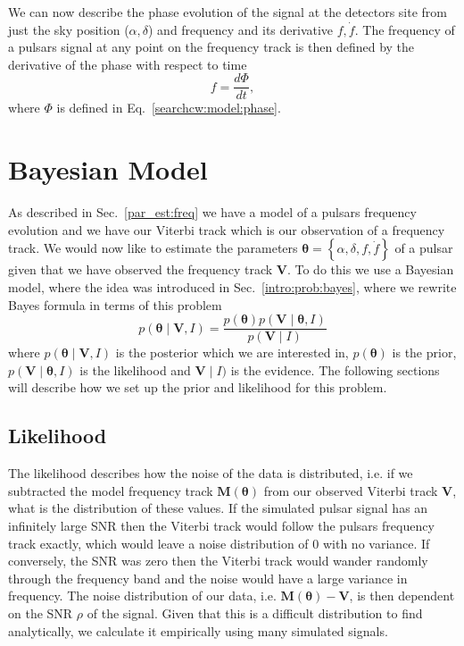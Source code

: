 We can now describe the phase evolution of the signal at the detectors site from just the sky position ($\alpha, \delta$) and frequency and its derivative $f,\dot{f}$. 
The frequency of a pulsars signal at any point on the frequency track is then defined by the derivative of the phase with respect to time
\begin{equation}
    f = \frac{d\Phi}{dt}, 
\end{equation}
where $\Phi$ is defined in Eq.~\ref{searchcw:model:phase}.

%
%
\section{\label{par_est:bayes}Bayesian Model}
%
%

As described in Sec.~\ref{par_est:freq} we have a model of a pulsars frequency evolution and we have our Viterbi track which is our observation of a frequency track.
We would now like to estimate the parameters $\bm{\theta} = \left\{\alpha, \delta, f, \dot{f} \right\}$ of a pulsar given that we have observed the frequency track $\bm{V}$.
To do this we use a Bayesian model, where the idea was introduced in Sec.~\ref{intro:prob:bayes}, where we rewrite Bayes formula in terms of this problem
\begin{equation}
    \label{par_est:bayes:eqn}
    p(\bm{\theta} \mid \bm{V}, I) = \frac{p(\bm{\theta}) p(\bm{V} \mid \bm{\theta}, I)}{p(\bm{V} \mid I)}
\end{equation}
where $p(\bm{\theta} \mid \bm{V}, I)$ is the posterior which we are interested in, $p(\bm{\theta})$ is the prior, $p(\bm{V} \mid \bm{\theta}, I)$ is the likelihood and $\bm{V} \mid I)$ is the evidence.
The following sections will describe how we set up the prior and likelihood for this problem.

%
%
\subsection{\label{par_est:bayes:likelihood}Likelihood}
%
%

The likelihood describes how the noise of the data is distributed, i.e. if we subtracted the model frequency track $\bm{M}(\bm{\theta})$ from our observed Viterbi track $\bm{V}$, what is the distribution of these values.
If the simulated pulsar signal has an infinitely large \gls{SNR} then the Viterbi track would follow the pulsars frequency track exactly, which would leave a noise distribution of 0 with no variance. 
If conversely, the \gls{SNR} was zero then the Viterbi track would wander randomly through the frequency band and the noise would have a large variance in frequency.
The noise distribution of our data, i.e. $\bm{M}(\bm{\theta}) - \bm{V}$, is then dependent on the \gls{SNR} $\rho$ of the signal. 
Given that this is a difficult distribution to find analytically, we calculate it empirically using many simulated signals.

